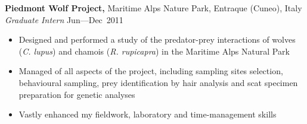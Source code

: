 
\vspace{5pt}

\textbf{Piedmont Wolf Project,} Maritime Alps Nature Park, Entraque (Cuneo), Italy
\emph{Graduate Intern} \hfill{Jun--–Dec~2011}
\begin{itemize}
  \item Designed and performed a study of the predator-prey interactions of wolves (\textit{C. lupus}) and chamois (\textit{R. rupicapra}) in the Maritime Alps Natural Park
  \item Managed of all aspects of the project, including sampling sites selection, behavioural sampling, prey identification by hair analysis and scat specimen preparation for genetic analyses
  \item Vastly enhanced my fieldwork, laboratory and time-management skills
\end{itemize}

